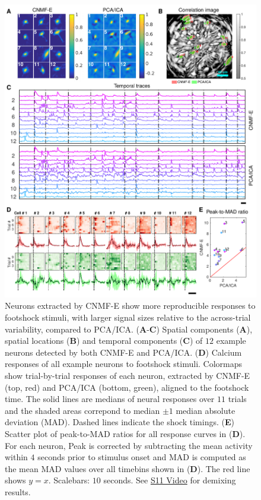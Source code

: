 \documentclass[9pt,lineno]{elife}
\begin{document}
\begin{figure}[!t]
  \centering
  \includegraphics[width=1\textwidth]{Fig_BNST.pdf}
  \caption{Neurons extracted by CNMF-E show more reproducible responses to footshock stimuli, with larger signal sizes relative to the across-trial variability, compared to PCA/ICA. (\textbf{A}-\textbf{C}) Spatial components (\textbf{A}), spatial locations (\textbf{B}) and temporal components (\textbf{C}) of $12$ example neurons detected by both CNMF-E and PCA/ICA.  (\textbf{D}) Calcium responses of all example neurons  to footshock stimuli. Colormaps show trial-by-trial responses of each neuron, extracted by CNMF-E (top, red) and PCA/ICA (bottom, green), aligned to the footshock time.  The solid lines are medians of neural responses over $11$ trials and the shaded areas correpond to median $\pm1$ median absolute deviation (MAD). Dashed lines indicate the shock timings. (\textbf{E}) Scatter plot of peak-to-MAD ratios for all response curves in (\textbf{D}). For each neuron, Peak is corrected by subtracting the mean activity within $4$ seconds prior to stimulus onset and MAD is computed as the mean MAD values over all timebins shown in (\textbf{D}). The red line shows $y=x$. Scalebars: $10$ seconds. See \href{http://www.columbia.edu/~pz2230/videos/footshock_demixing.mp4}{S11 Video} for demixing results.
}
  \label{fig:footshock}
\end{figure}
\end{document}

